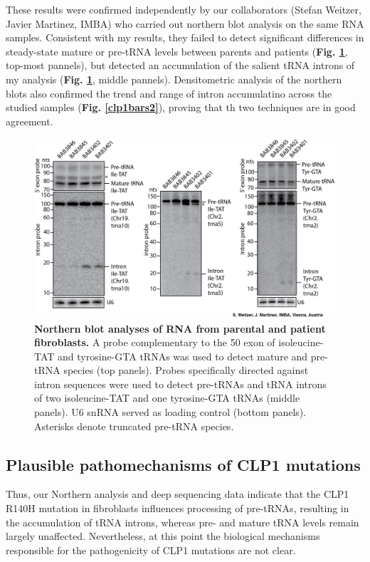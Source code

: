 \documentclass[12pt]{rockefeller}
\begin{document}
These results were confirmed independently by our collaborators (Stefan Weitzer, Javier Martinez, IMBA) who carried out northern blot analysis on the same RNA samples. Consistent with my results, they failed to detect significant differences in steady-state mature or pre-tRNA levels between parents and patients (\textbf{Fig. \ref{nb}}, top-most pannels), but detected an accumulation of the salient tRNA introns of my analysis (\textbf{Fig. \ref{nb}}, middle pannels). Densitometric analysis of the northern blots also confirmed the trend and range of intron accumulatino across the studied samples (\textbf{Fig. \ref{clp1bars2}}), proving that th two techniques are in good agreement. 

\begin{figure}[!ht]%
\centering
\includegraphics[width=\textwidth]{nb.png}%
\caption[Northern blot analyses of RNA from parental and patient fibroblasts.]
{\textbf{Northern blot analyses of RNA from parental and patient fibroblasts.}
A probe complementary to the 50 exon of isoleucine-TAT and tyrosine-GTA tRNAs was used to detect mature and pre-tRNA species (top panels). Probes specifically directed against intron sequences were used to detect pre-tRNAs and tRNA introns of two isoleucine-TAT and one tyrosine-GTA tRNAs (middle panels). U6 snRNA served as loading control (bottom panels). Asterisks denote truncated pre-tRNA species.}
\centering
\label{nb}%
\end{figure}

\subsection{Plausible pathomechanisms of CLP1 mutations}\label{clp1_evolution}
	Thus, our Northern analysis and deep sequencing data indicate that the CLP1 R140H mutation in fibroblasts influences processing of pre-tRNAs, resulting in the accumulation of tRNA introns, whereas pre- and mature tRNA levels remain largely unaffected. Nevertheless, at this point the biological mechanisms responsible for the pathogenicity of CLP1 mutations are not clear.
\end{document}
